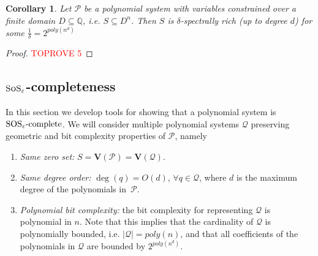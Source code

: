 \documentclass[11pt]{article}
\newcommand{\sos}{\text{\sc{SoS}}}
\newcommand{\Variety}[1]{{\textbf{V}}\left( #1 \right)}
\newcommand{\1}{\textbf{1}}
\newtheorem{corollary}[theorem]{Corollary}
\newcommand{\SOSe}{\rm{SOS}_\varepsilon\text{-complete}}
\begin{document}
\begin{corollary}\label{cor:rich-finite}
    Let $\mathcal{P}$ be a polynomial system with variables constrained over a finite domain $D \subseteq \mathbb{Q}$, i.e. $S \subseteq D^n$. Then $S$ is $\delta$-spectrally rich (up to degree $d$) for some $\frac{1}{\delta} = 2^{poly(n^d)}$ 
\end{corollary}

\begin{proof}\textcolor{red}{TOPROVE 5}\end{proof}

\subsection[SoS epsilon completeness]{$\sos_\varepsilon$-completeness}\label{sect:SOS_completeness}
In this section we develop tools for showing that a polynomial system is $\SOSe$.
We will consider multiple polynomial systems $\mathcal{Q}$ preserving geometric and bit complexity properties of $\mathcal{P}$, namely
\begin{enumerate}[label=A\arabic*.]
    \item \label{assumption_1} \textit{Same zero set:} $S = \Variety{\mathcal{P}} = \Variety{\mathcal{Q}}$.
    \item \label{assumption_2} \textit{Same degree order:} $\deg(q) = O(d)$, $ \forall q \in \mathcal{Q}$, where $d$ is the maximum degree of the polynomials in~$\mathcal{P}$.
    \item \label{assumption_3} \textit{Polynomial bit complexity:} the bit complexity for representing $\mathcal{Q}$ is polynomial in $n$. Note that this implies that the cardinality of $\mathcal{Q}$ is polynomially bounded, i.e. $|\mathcal{Q}| = poly(n)$, and that all coefficients of the polynomials in $\mathcal{Q}$ are bounded by $2^{poly(n^d)}$.
\end{enumerate}
\end{document}
